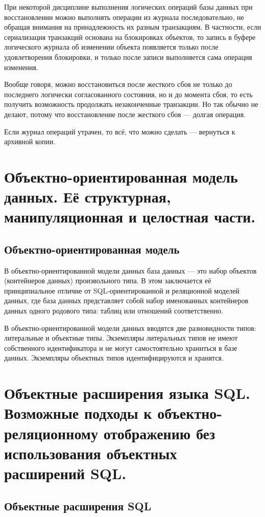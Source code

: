 \documentclass[a4paper,12pt]{article}
\begin{document}
При некоторой дисциплине выполнения логических операций базы данных при восстановлении можно выполнять операции из журнала последовательно, не обращая внимания на принадлежность их разным транзакциям. В частности, если сериализация транзакций основана на блокировках объектов, то запись в буфере логического журнала об изменении объекта появляется только после удовлетворения блокировки, и только после записи выполняется сама операция изменения.

Вообще говоря, можно восстановиться после жесткого сбоя не только до последнего логически согласованного состояния, но и до момента сбоя, то есть получить возможность продолжать незаконченные транзакции. Но так обычно не делают, потому что восстановление после жесткого сбоя --- долгая операция.

Если журнал операций утрачен, то всё, что можно сделать --- вернуться к архивной копии.

\section{Объектно-ориентированная модель данных. Её структурная, манипуляционная и целостная части.}

\subsection{Объектно-ориентированная модель}

В объектно-ориентированной модели данных база данных --- это набор объектов (контейнеров данных) произвольного типа. В этом заключается её принципиальное отличие от SQL-ориентированной и реляционной моделей данных, где база данных представляет собой набор именованных контейнеров данных одного родового типа: таблиц или отношений соответственно.

В объектно-ориентированной модели данных вводятся две разновидности типов: литеральные и объектные типы. Экземпляры литеральных типов не имеют собственного идентификатора и не могут самостоятельно храниться в базе данных. Экземпляры объектных типов идентифицируются и хранятся.

\section{Объектные расширения языка SQL. Возможные подходы к объектно-реляционному отображению без использования объектных расширений SQL.}

\subsection{Объектные расширения SQL}
\end{document}
